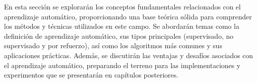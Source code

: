En esta sección se explorarán los conceptos fundamentales relacionados con el aprendizaje automático, proporcionando una base teórica sólida para comprender los métodos y técnicas utilizados en este campo. Se abordarán temas como la definición de aprendizaje automático, sus tipos principales (supervisado, no supervisado y por refuerzo), así como los algoritmos más comunes y sus aplicaciones prácticas. Además, se discutirán las ventajas y desafíos asociados con el aprendizaje automático, preparando el terreno para las implementaciones y experimentos que se presentarán en capítulos posteriores.